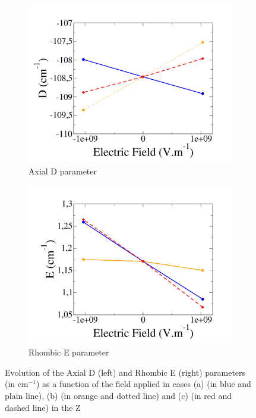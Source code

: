 \documentclass[10pt]{report}
\numberwithin{equation}{section}
\begin{document}
\begin{figure}[!h]
    \centering
    \begin{subfigure}{.5\textwidth}
      \centering
      \includegraphics[width=\linewidth]{Images/D_E_Z.png}
      \caption{Axial D parameter}
      \label{fig:Ni_D_Z}
    \end{subfigure}%
    \begin{subfigure}{.5\textwidth}
      \centering
      \includegraphics[width=\linewidth]{Images/E_E_Z.png}
      \caption{Rhombic E parameter}
      \label{fig:Ni_E_Z}
    \end{subfigure}
    \caption{Evolution of the Axial D (left) and Rhombic E (right) parameters (in cm$^{-1}$) as a function of the field applied in cases (a) (in blue and plain line), (b)
    (in orange and dotted line) and (c) (in red and dashed line) in the Z}
    \label{fig:ParamNi_E_Z}
\end{figure}
\end{document}
